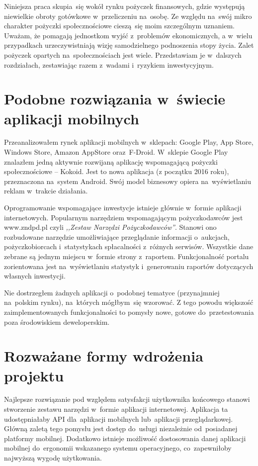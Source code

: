 \documentclass[a4paper,twoside,titlepage,openright]{book}
\begin{document}
Niniejsza praca skupia~się wokół rynku pożyczek finansowych, gdzie występują niewielkie obroty gotówkowe w~przeliczeniu na~osobę. Ze względu na~swój mikro charakter pożyczki społecznościowe cieszą~się moim szczególnym uznaniem. Uważam, że pomagają jednostkom wyjść z~problemów ekonomicznych, a w~wielu przypadkach urzeczywistniają wizję samodzielnego podnoszenia stopy życia. Zalet pożyczek opartych na~społecznościach jest wiele. Przedstawiam je w~dalszych rozdziałach, zestawiając razem z~wadami i~ryzykiem inwestycyjnym.

\section*{Podobne rozwiązania w~świecie aplikacji mobilnych}

Przeanalizowałem rynek aplikacji mobilnych w~sklepach: Google Play, App Store, Windows Store, Amazon AppStore oraz~F-Droid. W~sklepie Google Play znalazłem jedną aktywnie rozwijaną aplikację wspomagającą pożyczki społecznościowe -- Kokoid. Jest to nowa aplikacja (z początku 2016 roku), przeznaczona na~system Android. Swój model biznesowy opiera na~wyświetlaniu reklam w~trakcie działania.

Oprogramowanie wspomagające inwestycje istnieje głównie w~formie aplikacji internetowych. Popularnym narzędziem wspomagającym pożyczkodawców jest www.zndpd.pl czyli \textit{,,Zestaw Narzędzi Pożyczkodawców''}. Stanowi ono rozbudowane narzędzie umożliwiające przeglądanie informacji o~aukcjach, pożyczkobiorcach i~statystykach spłacalności z~różnych serwisów. Wszystkie dane zebrane są jednym miejscu w~formie strony z~raportem. Funkcjonalność portalu zorientowana jest na~wyświetlaniu statystyk i~generowaniu raportów dotyczących własnych inwestycji.

Nie dostrzegłem żadnych aplikacji o~podobnej tematyce (przynajmniej na~polskim rynku), na~których mógłbym~się wzorować. Z tego powodu większość zaimplementowanych funkcjonalności to pomysły nowe, gotowe do~przetestowania poza środowiskiem deweloperskim.

\section*{Rozważane formy wdrożenia projektu}

Najlepsze rozwiązanie pod względem satysfakcji użytkownika końcowego stanowi stworzenie zestawu narzędzi w~formie aplikacji internetowej. Aplikacja ta udostępniałaby API dla~aplikacji mobilnych lub~aplikacji przeglądarkowej. Główną zaletą tego pomysłu jest dostęp do~usługi niezależnie od~posiadanej platformy mobilnej. Dodatkowo istnieje możliwość dostosowania danej aplikacji mobilnej do~ergonomii wskazanego systemu operacyjnego, co~zapewniłoby najwyższą wygodę użytkowania. 
\end{document}
